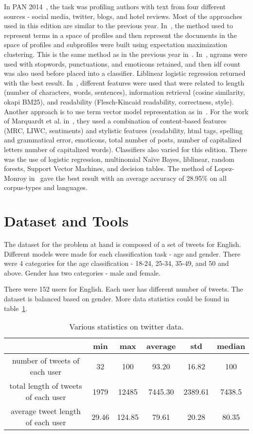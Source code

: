 \documentclass[a4paper]{llncs}
\begin{document}
In PAN 2014~\cite{rangel2014overview}, the task was profiling authors with text from four different sources - social media, twitter, blogs, and hotel reviews. Most of the approaches used in this edition are similar to the previous year. In~\cite{lopezusing}, the method used to represent terms in a space of profiles and then represent the documents in the space of profiles and subprofiles were built using expectation maximization clustering. This is the same method as in the previous year in~\cite{lopez2013inaoe}. In~\cite{maharjansimple}, ngrams were used with stopwords, punctuations, and emoticons retained, and then idf count was also used before placed into a classifier. Liblinear logistic regression returned with the best result. In~\cite{weren6exploring}, different features were used that were related to length (number of characters, words, sentences), information retrieval (cosine similarity, okapi BM25), and readability (Flesch-Kincaid readability, correctness, style). Another approach is to use term vector model representation as in~\cite{villenadaedalus}. For the work of Marquardt et al. in~\cite{marquardt2014age}, they used a combination of content-based features (MRC, LIWC, sentiments) and stylistic features (readability, html tags, spelling and grammatical error, emoticons, total number of posts, number of capitalized letters number of capitalized words). Classifiers also varied for this edition. There was the use of logistic regression, multinomial Naïve Bayes, liblinear, random forests, Support Vector Machines, and decision tables. The method of Lopez-Monroy in~\cite{lopezusing} gave the best result with an average accuracy of 28.95\% on all corpus-types and languages. 

\section{Dataset and Tools}
The dataset for the problem at hand is composed of a set of tweets for English. Different models were made for each classification task - age and gender. There were 4 categories for the age classification - 18-24, 25-34, 35-49, and 50 and above. Gender has two categories - male and female. 

There were 152 users for English. Each user has different number of tweets. The dataset is balanced based on gender. More data statistics could be found in table~\ref{table:TweetStats}.

\begin{table}[!htbp]
\centering
\begin{tabular}{|c|c|c|c|c|c|}
\hline
                                    & min   & max    & average & std     & median \\ \hline
number of tweets of each user       & 32    & 100    & 93.20   & 16.82   & 100    \\ \hline
total length of tweets of each user & 1979  & 12485  & 7445.30 & 2389.61 & 7438.5 \\ \hline
average tweet length of each user   & 29.46 & 124.85 & 79.61   & 20.28   & 80.35  \\ \hline
\end{tabular}
\caption{Various statistics on twitter data.}
\label{table:TweetStats}
\end{table}
\end{document}
